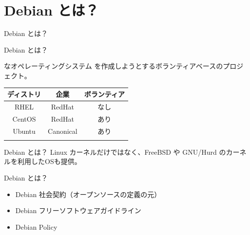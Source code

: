 \section{Debian とは？}
\begin{frame}\begin{center}\Huge{Debian とは？}\end{center}\end{frame}

\begin{frame}{Debian とは？}

{\color{red}{フリー/オープン}}な{\color{red}{ユニバーサル}}オペレーティングシステム を作成しようとするボランティアベースのプロジェクト。

\begin{table}[htb]
  \begin{tabular}{|c|c|c|}
    \hline
    ディストリ & 企業 & ボランティア \\ \hline
    RHEL & RedHat & なし  \\ \hline
    CentOS & RedHat & あり \\ \hline
    Ubuntu  & Canonical & あり \\ \hline
    \color{red}{Debian}  & \color{red}{なし} & \color{red}{あり} \\ \hline
  \end{tabular}
\end{table}

\end{frame}

\begin{frame}{Debian とは？}
Linux カーネルだけではなく、FreeBSD や GNU/Hurd のカーネルを利用したOSも提供。


\end{frame}

\begin{frame}{Debian とは？}

  \begin{itemize}
  \item Debian 社会契約（オープンソースの定義の元）
  \item Debian フリーソフトウェアガイドライン
  \item Debian Policy
  \end{itemize}

\end{frame}

